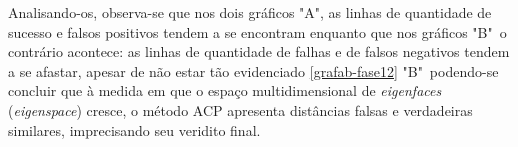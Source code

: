 Analisando-os, observa-se que nos dois gráficos "A", as linhas de quantidade de sucesso e falsos positivos tendem a se encontram enquanto que nos gráficos "B"\, o contrário acontece: as linhas de quantidade de falhas e de falsos negativos tendem a se afastar, apesar de não estar tão evidenciado \autoref{grafab-fase12} "B"\, podendo-se concluir que à medida em que o espaço multidimensional de \textit{eigenfaces} (\textit{eigenspace}) cresce, o método ACP apresenta distâncias falsas e verdadeiras similares, imprecisando seu veridito final.
























